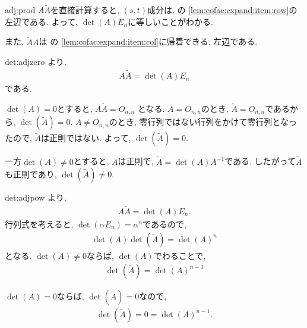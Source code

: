 \begin{proofof}{adj:prod}
  $A\tilde A$を直接計算すると,
  $(s,t)$成分は,
  の
  \cref{lem:cofac:expand:item:row}の
  左辺である.
  よって, $\det(A)E_n$に等しいことがわかる.

  また, $\tilde A A$は
  の
  \cref{lem:cofac:expand:item:col}に帰着できる.
  左辺である.
\end{proofof}

\begin{proofof*}{det:adj}{zero}
  より,
  \begin{align*}
    A \tilde A =\det(A)E_n
  \end{align*}
  である.

  $\det(A)=0$とすると,
  $A \tilde A =O_{n,n}$
  となる.
  $A=O_{n,n}$のとき, $\tilde A=O_{n,n}$であるから,
  $\det(\tilde A)=0$.
  $A\neq O_{n,n}$のとき,
  零行列ではない行列をかけて零行列となったので,
  $\tilde A$は正則ではない.
  よって, $\det(\tilde A)=0$.
  
  一方$\det(A)\neq 0$とすると,
  $A$は正則で,
  $\tilde A=\det(A)A^{-1}$である.
  したがって$\tilde A$も正則であり,
  $\det(\tilde A)\neq 0$.


\end{proofof*}
\begin{proofof*}{det:adj}{pow}
より,
\begin{align*}
  A \tilde A =\det(A)E_n.
\end{align*}
行列式を考えると,
$\det(\alpha E_n)=\alpha^n$であるので,
\begin{align*}
  \det(A) \det(\tilde A) =\det(A)^n
\end{align*}
となる.
$\det(A)\neq 0$ならば,
$\det(A)$でわることで,
\begin{align*}
  \det(\tilde A) =\det(A)^{n-1}
\end{align*}

$\det(A)=0$ならば, 
$\det(\tilde A)=0$なので,
\begin{align*}
  \det(\tilde A)=0 =\det(A)^{n-1}.
\end{align*}

\end{proofof*}


